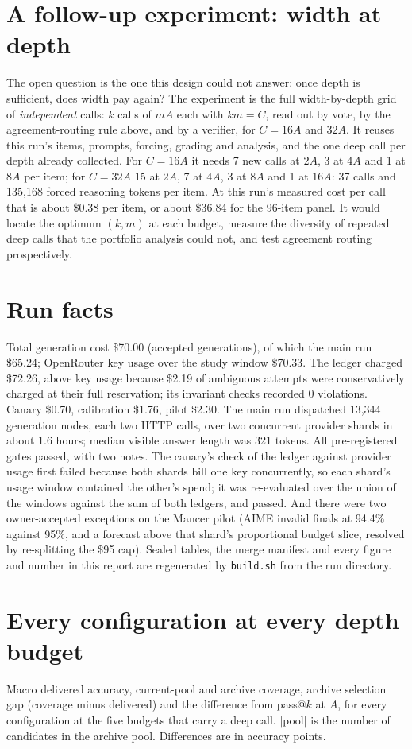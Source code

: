 \documentclass[11pt]{article}
\begin{document}
\section{A follow-up experiment: width at depth}
\label{sec:follow}

The open question is the one this design could not answer: once depth is sufficient, does width pay again? The
experiment is the full width-by-depth grid of \emph{independent} calls: $k$ calls of $mA$ each with $km = C$,
read out by vote, by the agreement-routing rule above, and by a verifier, for $C = 16A$ and $32A$. It reuses
this run's items, prompts, forcing, grading and analysis, and the one deep call per depth already collected.
For $C=16A$ it needs 7 new calls at $2A$, 3 at $4A$ and 1 at $8A$ per item; for $C=32A$ 15 at $2A$, 7 at $4A$,
3 at $8A$ and 1 at $16A$: 37 calls and 135,168 forced
reasoning tokens per item. At this run's measured cost per call that is about \$0.38 per
item, or about \$36.84 for the 96-item panel. It would locate the optimum $(k, m)$ at
each budget, measure the diversity of repeated deep calls that the portfolio analysis could not, and test
agreement routing prospectively.

\appendix
\section{Run facts}

Total generation cost \$70.00 (accepted generations), of which the main run
\$65.24; OpenRouter key usage over the study window \$70.33. The ledger
charged \$72.26, above key usage because \$2.19 of ambiguous
attempts were conservatively charged at their full reservation; its invariant checks recorded
0 violations. Canary \$0.70, calibration
\$1.76, pilot \$2.30. The main run dispatched
13,344 generation nodes, each two HTTP calls, over two concurrent provider shards in
about 1.6 hours; median visible answer length was 321 tokens. All pre-registered gates
passed, with two notes. The canary's check of the ledger against provider usage first failed because both
shards bill one key concurrently, so each shard's usage window contained the other's spend; it was
re-evaluated over the union of the windows against the sum of both ledgers, and passed. And there were two
owner-accepted exceptions on the Mancer pilot (AIME invalid finals at 94.4\% against 95\%,
and a forecast above that shard's proportional budget slice, resolved by re-splitting the \$95 cap).
Sealed tables, the merge manifest and every figure and number in this report are regenerated by
\texttt{build.sh} from the run directory.

\section{Every configuration at every depth budget}
\label{app:full}

Macro delivered accuracy, current-pool and archive coverage, archive selection gap (coverage minus delivered)
and the difference from pass@$k$ at $A$, for every configuration at the five budgets that carry a deep call.
$|$pool$|$ is the number of candidates in the archive pool. Differences are in accuracy points.

{\small

}
\end{document}

